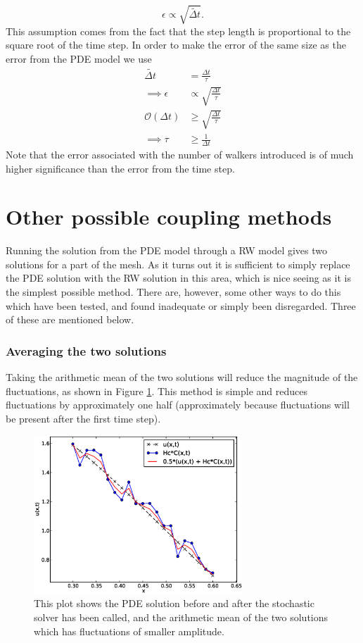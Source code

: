 \begin{equation}
 \epsilon \propto \sqrt{\tilde{\Delta t}}.
\end{equation}
This assumption comes from the fact that the step length is proportional to the square root of the time step.
In order to make the error of the same size as the error from the PDE model we use 
\begin{align*}
 \tilde{\Delta t} &= \frac{\Delta t}{\tau} \\
 \implies \epsilon &\propto \sqrt{\frac{\Delta t}{\tau}} \\
 \mathcal{O}(\Delta t) &\geq \sqrt{\frac{\Delta t}{\tau}} \\
 \implies \tau &\geq \frac{1}{\Delta t}
\end{align*}
\noindent Note that the error associated with the number of walkers introduced is of much higher significance than the error from the time step.

\section{Other possible coupling methods}\label{other_possible_coupling_methods}

Running the solution from the PDE model through a RW model gives two solutions for a part of the mesh. 
As it turns out it is sufficient to simply replace the PDE solution with the RW solution in this area, which is nice seeing as it is the simplest possible method. 
There are, however, some other ways to do this which have been tested, and found inadequate or simply been disregarded. Three of these are mentioned below. 

\subsubsection{Averaging the two solutions}
 Taking the arithmetic mean of the two solutions will reduce the magnitude of the fluctuations, as shown in Figure \ref{theory:average}. 
 This method is simple and reduces fluctuations by approximately one half (approximately because fluctuations will be present after the first time step). 
 \begin{figure}[h]
  \centering
  \includegraphics[width=0.7\textwidth]{Figures/average.eps}
  \caption[Idea behind averaging solutions]{This plot shows the PDE solution before and after the stochastic solver has been called, and the arithmetic mean of the two solutions which has fluctuations of smaller amplitude.}
  \label{theory:average}
 \end{figure}

